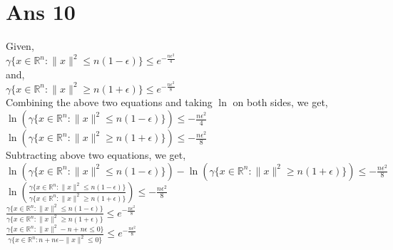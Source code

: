 \documentclass[10pt]{article}
\begin{document}
\section*{Ans 10}
\begin{flushleft}
Given, \\
\vspace{0.5em}
$\gamma\{x \in \mathbb{R} ^{n}: \parallel x \parallel ^{2} \leq n(1 - \epsilon)\} \leq e^{-\frac{n \epsilon^{2}}{4}}$\\
and, \\
\vspace{0.5em}
$\gamma\{x \in \mathbb{R} ^{n}: \parallel x \parallel ^{2} \geq n(1 + \epsilon)\} \leq e^{-\frac{n \epsilon^{2}}{8}}$\\
\vspace{0.5em}
Combining the above two equations and taking $\ln$ on both sides, we get,\\
\vspace{0.5em}
$\ln(\gamma\{x \in \mathbb{R} ^{n}: \parallel x \parallel ^{2} \leq n(1 - \epsilon)\}) \leq -\frac{n \epsilon^{2}}{4}$\\
\vspace{0.5em}
$\ln(\gamma\{x \in \mathbb{R} ^{n}: \parallel x \parallel ^{2} \geq n(1 + \epsilon)\}) \leq -\frac{n \epsilon^{2}}{8}$\\
\vspace{0.5em}
Subtracting above two equations, we get, \\
\vspace{0.5em}
$\ln(\gamma\{x \in \mathbb{R} ^{n}: \parallel x \parallel ^{2} \leq n(1 - \epsilon)\}) - \ln(\gamma\{x \in \mathbb{R} ^{n}: \parallel x \parallel ^{2} \geq n(1 + \epsilon)\}) \leq -\frac{n \epsilon^{2}}{8}$\\
\vspace{0.5em}
$\ln(\frac{\gamma\{x \in \mathbb{R} ^{n}: \parallel x \parallel ^{2} \leq n(1 - \epsilon)\}}{\gamma\{x \in \mathbb{R} ^{n}: \parallel x \parallel ^{2} \geq n(1 + \epsilon)\}}) \leq -\frac{n \epsilon^{2}}{8}$\\
\vspace{0.5em}
$\frac{\gamma\{x \in \mathbb{R} ^{n}: \parallel x \parallel ^{2} \leq n(1 - \epsilon)\}}{\gamma\{x \in \mathbb{R} ^{n}: \parallel x \parallel ^{2} \geq n(1 + \epsilon)\}} \leq e^{-\frac{n \epsilon^{2}}{8}}$\\
\vspace{0.5em}
$\frac{\gamma\{x \in \mathbb{R} ^{n}: \parallel x \parallel ^{2} - n + n \epsilon \leq 0 \}}{\gamma\{x \in \mathbb{R} ^{n}: n + n\epsilon -\parallel x \parallel ^{2}  \leq 0 \}} \leq e^{-\frac{n \epsilon^{2}}{8}}$\\

\end{flushleft}
\end{document}
